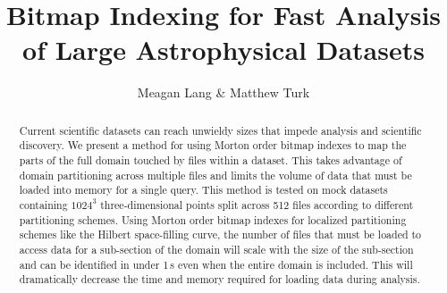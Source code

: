 \documentclass[apjl]{emulateapj}
\begin{document}

\title{Bitmap Indexing for Fast Analysis of Large Astrophysical Datasets}

\author{Meagan Lang \& Matthew Turk}




\begin{abstract}
Current scientific datasets can reach unwieldy sizes that impede analysis and scientific discovery. We present a method for using Morton order bitmap indexes to map the parts of the full domain touched by files within a dataset. This takes advantage of domain partitioning across multiple files and limits the volume of data that must be loaded into memory for a single query. This method is tested on mock datasets containing $1024^3$ three-dimensional points split across 512 files according to different partitioning schemes. Using Morton order bitmap indexes for localized partitioning schemes like the Hilbert space-filling curve, the number of files that must be loaded to access data for a sub-section of the domain will scale with the size of the sub-section and can be identified in under 1\,s even when the entire domain is included. This will dramatically decrease the time and memory required for loading data during analysis.
\end{abstract}


\end{document}
